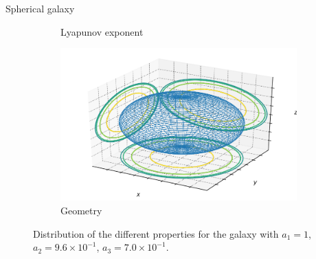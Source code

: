 \documentclass{beamer}
\begin{document}
\begin{frame}{Spherical galaxy}
\begin{figure}[h]
\begin{subfigure}[t]{0.35\textwidth}
			\caption{Lyapunov exponent}
		\end{subfigure}
		\begin{subfigure}[t]{0.35\textwidth}
			\includegraphics[width=\textwidth]{"../Files/Week 13/images/10_ellipsoid"}
			\caption{Geometry}
		\end{subfigure}
		\caption{Distribution of the different properties for the galaxy with $a_1 = 1$, $a_2 = 9.6\times10^{-1}$, $a_3 = 7.0\times10^{-1}$.}
	\end{figure}
\end{frame}
\end{document}
